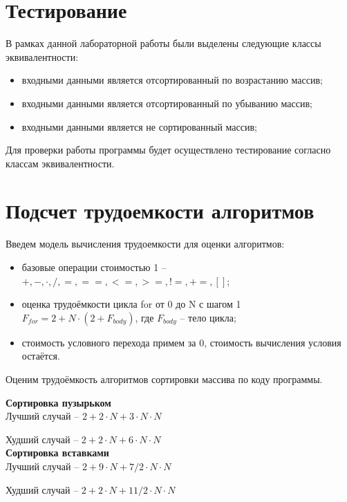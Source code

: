\documentclass[12pt,a4paper]{report}
\begin{document}
\section{Тестирование}

В рамках данной лабораторной работы были выделены следующие классы эквивалентности:
\begin{itemize}
	\item входными данными является отсортированный по возрастанию массив;
	\item входными данными является отсортированный по убыванию массив;
	\item входными данными является не сортированный массив;
\end{itemize}

Для проверки работы программы будет осуществлено тестирование согласно классам эквивалентности.

\newpage
\section{Подсчет трудоемкости алгоритмов}

Введем модель вычисления трудоемкости для оценки алгоритмов:

\begin{itemize}
    \item базовые операции стоимостью 1 -- $+, -, \cdot , /, =, ==, <=, >=, !=, +=, []$;
    \item оценка трудоёмкости цикла for от 0 до N с шагом 1 $F_{for} = 2 + N \cdot (2 + F_{body})$, где $F_{body}$ -- тело цикла;
    \item стоимость условного перехода примем за 0, стоимость вычисления условия остаётся. 
\end{itemize}

Оценим трудоёмкость алгоритмов сортировки массива по коду программы.

\textbf{Сортировка пузырьком} \\

Лучший случай -- $2 + 2 \cdot N + 3 \cdot N \cdot N$

Худший случай -- $2 + 2 \cdot N + 6 \cdot N \cdot N$ \\

\textbf{Сортировка вставками} \\

Лучший случай -- $2 + 9 \cdot N + 7/2 \cdot N \cdot N$

Худший случай -- $2 + 2 \cdot N + 11/2 \cdot N \cdot N$ \\
\end{document}
